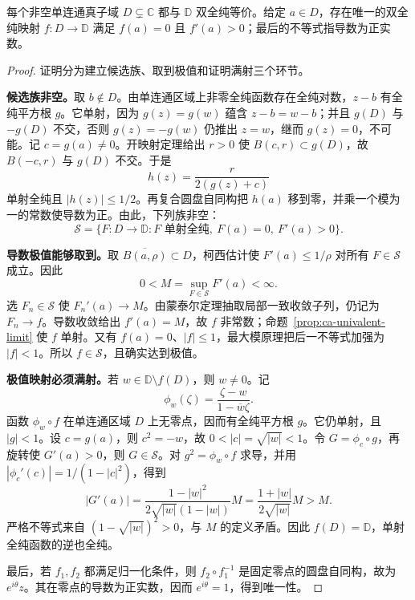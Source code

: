 \begin{theorem}
\label{thm:ca-riemann-mapping}
每个非空单连通真子域 $D\subsetneq\mathbb C$ 都与 $\mathbb D$ 双全纯等价。给定 $a\in D$，存在唯一的双全纯映射 $f:D\to\mathbb D$ 满足 $f(a)=0$ 且 $f'(a)>0$；最后的不等式指导数为正实数。
\end{theorem}
\begin{proof}
证明分为建立候选族、取到极值和证明满射三个环节。

\textbf{候选族非空。}取 $b\notin D$。由单连通区域上非零全纯函数存在全纯对数，$z-b$ 有全纯平方根 $g$。它单射，因为 $g(z)=g(w)$ 蕴含 $z-b=w-b$；并且 $g(D)$ 与 $-g(D)$ 不交，否则 $g(z)=-g(w)$ 仍推出 $z=w$，继而 $g(z)=0$，不可能。记 $c=g(a)\ne0$。开映射定理给出 $r>0$ 使 $B(c,r)\subset g(D)$，故 $B(-c,r)$ 与 $g(D)$ 不交。于是
\[
 h(z)=\frac{r}{2(g(z)+c)}
\]
单射全纯且 $|h(z)|\le1/2$。再复合圆盘自同构把 $h(a)$ 移到零，并乘一个模为一的常数使导数为正。由此，下列族非空：
\[
 \mathcal S=\{F:D\to\mathbb D:F\text{ 单射全纯},\ F(a)=0,\ F'(a)>0\}.
\]

\textbf{导数极值能够取到。}取 $\overline{B(a,\rho)}\subset D$，柯西估计使 $F'(a)\le1/\rho$ 对所有 $F\in\mathcal S$ 成立。因此
\[
 0<M=\sup_{F\in\mathcal S}F'(a)<\infty.
\]
选 $F_n\in\mathcal S$ 使 $F_n'(a)\to M$。由蒙泰尔定理抽取局部一致收敛子列，仍记为 $F_n\to f$。导数收敛给出 $f'(a)=M$，故 $f$ 非常数；命题~\ref{prop:ca-univalent-limit} 使 $f$ 单射。又有 $f(a)=0$、$|f|\le1$，最大模原理把后一不等式加强为 $|f|<1$。所以 $f\in\mathcal S$，且确实达到极值。

\textbf{极值映射必须满射。}若 $w\in\mathbb D\setminus f(D)$，则 $w\ne0$。记
\[
 \phi_w(\zeta)=\frac{\zeta-w}{1-\overline w\zeta}.
\]
函数 $\phi_w\circ f$ 在单连通区域 $D$ 上无零点，因而有全纯平方根 $g$。它仍单射，且 $|g|<1$。设 $c=g(a)$，则 $c^2=-w$，故 $0<|c|=\sqrt{|w|}<1$。令 $G=\phi_c\circ g$，再旋转使 $G'(a)>0$，则 $G\in\mathcal S$。对 $g^2=\phi_w\circ f$ 求导，并用 $|\phi_c'(c)|=1/(1-|c|^2)$，得到
\begin{equation}
 |G'(a)|=\frac{1-|w|^2}{2\sqrt{|w|}(1-|w|)}M
 =\frac{1+|w|}{2\sqrt{|w|}}M>M.
 \label{eq:ca-riemann-extremal-contradiction}
\end{equation}
严格不等式来自 $(1-\sqrt{|w|})^2>0$，与 $M$ 的定义矛盾。因此 $f(D)=\mathbb D$，单射全纯函数的逆也全纯。

最后，若 $f_1,f_2$ 都满足归一化条件，则 $f_2\circ f_1^{-1}$ 是固定零点的圆盘自同构，故为 $e^{i\theta}z$。其在零点的导数为正实数，因而 $e^{i\theta}=1$，得到唯一性。
\end{proof}

